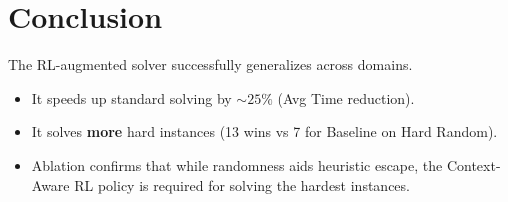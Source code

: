 \documentclass{article}
\begin{document}
\section{Conclusion}
The RL-augmented solver successfully generalizes across domains.
\begin{itemize}
    \item It speeds up standard solving by $\sim 25\%$ (Avg Time reduction).
    \item It solves \textbf{more} hard instances (13 wins vs 7 for Baseline on Hard Random).
    \item Ablation confirms that while randomness aids heuristic escape, the Context-Aware RL policy is required for solving the hardest instances.
\end{itemize}
\end{document}
